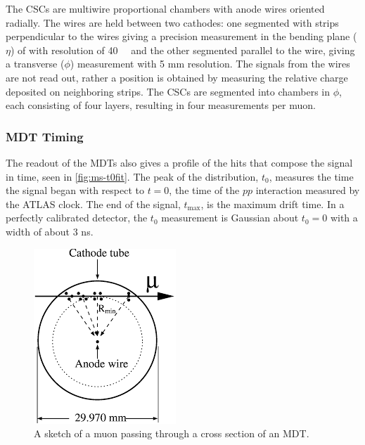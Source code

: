 The \ac{CSC}s are multiwire proportional chambers with anode wires oriented radially. The wires are held between two cathodes: one segmented with strips perpendicular to the wires giving a precision measurement in the bending plane ($\eta$) of with resolution of 40~\um~ and the other segmented parallel to the wire, giving a transverse ($\phi$) measurement with 5 mm resolution. The signals from the wires are not read out, rather a position is obtained by measuring the relative charge deposited on neighboring strips. The \ac{CSC}s are segmented into chambers in $\phi$, each consisting of four layers, resulting in four measurements per muon.


\subsubsection{MDT Timing}
\label{sec:mdt-timing}
The readout of the \ac{MDT}s also gives a profile of the hits that compose the signal in time, seen in \autoref{fig:ms-t0fit}. The peak of the distribution, $t_{0}$, measures the time the signal began with respect to $t=0$, the time of the $pp$ interaction measured by the \ac{ATLAS} clock. The end of the signal, $t_{\text{max}}$, is the maximum drift time. In a perfectly calibrated detector, the $t_{0}$ measurement is Gaussian about $t_{0} = 0$ with a width of about 3 ns. 



\begin{figure}[htbp]
\centering
\includegraphics[width=.4\textwidth]{figures/Detector/ms-drift.png}
\caption{A sketch of a muon passing through a cross section of an \ac{MDT}. \cite{atlas-overview}}
\label{fig:ms-drift}
\end{figure}

